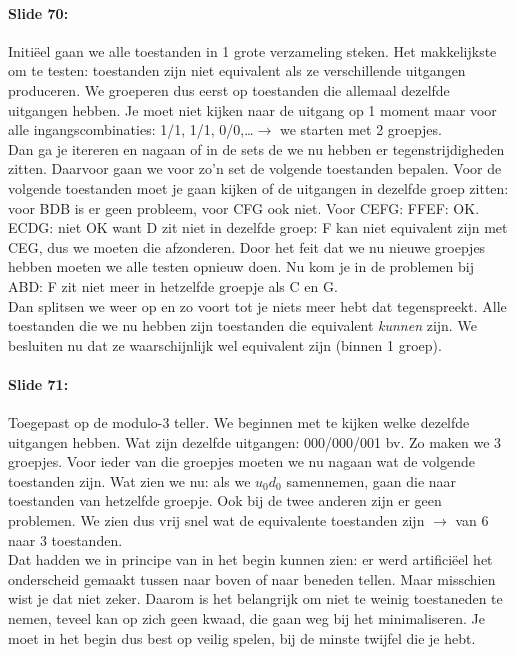 \documentclass[10pt,a4paper]{book}
\begin{document}
\paragraph{Slide 70:} Initi\"eel gaan we alle toestanden in 1 grote verzameling steken. Het makkelijkste om te testen: toestanden zijn niet equivalent als ze verschillende uitgangen produceren. We groeperen dus eerst op toestanden die allemaal dezelfde uitgangen hebben. Je moet niet kijken naar de uitgang op 1 moment maar voor alle ingangscombinaties: 1/1, 1/1, 0/0,\ldots $\rightarrow$ we starten met 2 groepjes. \\
Dan ga je itereren en nagaan of in de sets de we nu hebben er tegenstrijdigheden zitten. Daarvoor gaan we voor zo'n set de volgende toestanden bepalen.  Voor de volgende toestanden moet je gaan kijken of de uitgangen in dezelfde groep zitten: voor BDB is er geen probleem, voor CFG ook niet. Voor CEFG: FFEF: OK. ECDG: niet OK want D zit niet in dezelfde groep: F kan niet equivalent zijn met CEG, dus we moeten die afzonderen. Door het feit dat we nu nieuwe groepjes hebben moeten we alle testen opnieuw doen. Nu kom je in de problemen bij ABD: F zit niet meer in hetzelfde groepje als C en G.\\
Dan splitsen we weer op en zo voort tot je niets meer hebt dat tegenspreekt. Alle toestanden die we nu hebben zijn toestanden die equivalent \emph{kunnen} zijn. We besluiten nu dat ze waarschijnlijk wel equivalent zijn (binnen 1 groep).

\paragraph{Slide 71:} Toegepast op de modulo-3 teller. We beginnen met te kijken welke dezelfde uitgangen hebben. Wat zijn dezelfde uitgangen: 000/000/001 bv. Zo maken we 3 groepjes. Voor ieder van die groepjes moeten we nu nagaan wat de volgende toestanden zijn. Wat zien we nu: als we $u_0d_0$ samennemen, gaan die naar toestanden van hetzelfde groepje. Ook bij de twee anderen zijn er geen problemen. We zien dus vrij snel wat de equivalente toestanden zijn $\rightarrow$ van 6 naar 3 toestanden.\\
Dat hadden we in principe van in het begin kunnen zien: er werd artifici\"eel het onderscheid gemaakt tussen naar boven of naar beneden tellen. Maar misschien wist je dat niet zeker. Daarom is het belangrijk om niet te weinig toestaneden te nemen, teveel kan op zich geen kwaad, die gaan weg bij het minimaliseren. Je moet in het begin dus best op veilig spelen, bij de minste twijfel die je hebt.
\end{document}
